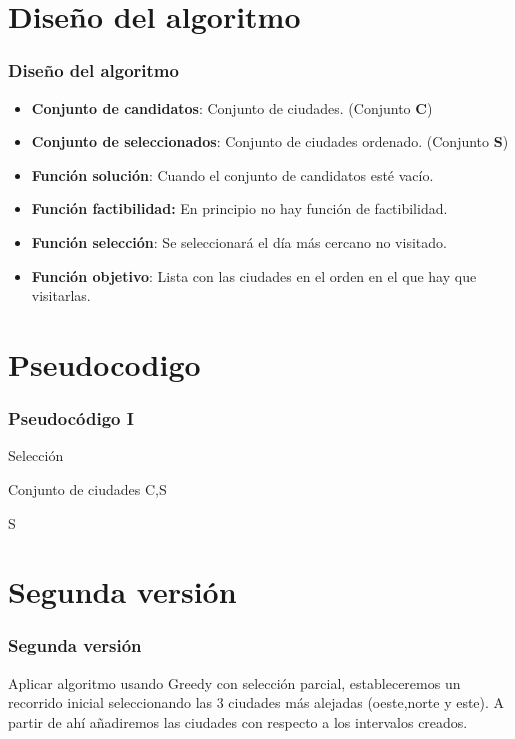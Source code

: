 \documentclass{beamer}
\begin{document}
\section{Diseño del algoritmo} 
\begin{frame}
	\frametitle{Diseño del algoritmo}
	\begin{itemize}
		\item \textbf{Conjunto de candidatos}: Conjunto de ciudades. (Conjunto \textbf{C})
		\item \textbf{Conjunto de seleccionados}: Conjunto de ciudades ordenado. (Conjunto \textbf{S})
		\item \textbf{Función solución}: Cuando el conjunto de candidatos esté vacío.
		\item \textbf{Función factibilidad:} En principio no hay función de factibilidad.
		\item \textbf{Función selección}: Se seleccionará el día más cercano no visitado.
		\item \textbf{Función objetivo}: Lista con las ciudades en el orden en el que hay que visitarlas.		
	\end{itemize}
	
\end{frame}

\section{Pseudocodigo}
\begin{frame}
	\frametitle{Pseudocódigo I}
	Selección

	\begin{algorithmic}
	\Require Conjunto de ciudades C,S
		\EndIf
	\EndFor  
	
	\Return S	
	\end{algorithmic}	
\end{frame}


\section{Segunda versión} 
\begin{frame}
	\frametitle{Segunda versión}
	Aplicar algoritmo usando Greedy con selección parcial, estableceremos un recorrido inicial seleccionando las 3 ciudades más alejadas (oeste,norte y este). A partir de ahí añadiremos las ciudades con respecto a los intervalos creados.
	
\end{frame}
\end{document}
